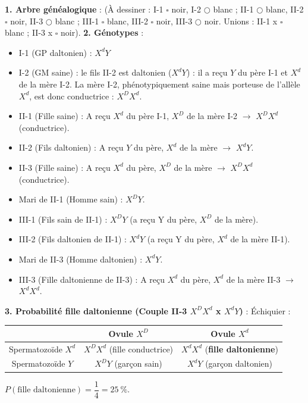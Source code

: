 \documentclass[11pt]{article}
\begin{document}
\begin{corrige}[Exercice n°1]
\textbf{1. Arbre généalogique} : (À dessiner : I-1 $\square$ noir, I-2 $\bigcirc$ blanc ; II-1 $\bigcirc$ blanc, II-2 $\square$ noir, II-3 $\bigcirc$ blanc ; III-1 $\square$ blanc, III-2 $\square$ noir, III-3 $\bigcirc$ noir. Unions : II-1 x $\square$ blanc ; II-3 x $\square$ noir).
\textbf{2. Génotypes} :
\begin{itemize}
\item I-1 (GP daltonien) : $X^d Y$
\item I-2 (GM saine) : le fils II-2 est daltonien ($X^d Y$) : il a reçu $Y$ du père I-1 et $X^d$ de la mère I-2. La mère I-2, phénotypiquement saine mais porteuse de l'allèle $X^d$, est donc conductrice : $X^D X^d$.
\item II-1 (Fille saine) : A reçu $X^d$ du père I-1, $X^D$ de la mère I-2 $\rightarrow$ $X^D X^d$ (conductrice).
\item II-2 (Fils daltonien) : A reçu $Y$ du père, $X^d$ de la mère $\rightarrow$ $X^d Y$.
\item II-3 (Fille saine) : A reçu $X^d$ du père, $X^D$ de la mère $\rightarrow$ $X^D X^d$ (conductrice).
\item Mari de II-1 (Homme sain) : $X^D Y$.
\item III-1 (Fils sain de II-1) : $X^D Y$ (a reçu Y du père, $X^D$ de la mère).
\item III-2 (Fils daltonien de II-1) : $X^d Y$ (a reçu Y du père, $X^d$ de la mère II-1).
\item Mari de II-3 (Homme daltonien) : $X^d Y$.
\item III-3 (Fille daltonienne de II-3) : A reçu $X^d$ du père, $X^d$ de la mère II-3 $\rightarrow$ $X^d X^d$.
\end{itemize}
\textbf{3. Probabilité fille daltonienne (Couple II-3 $X^D X^d$ x $X^d Y$)} :
Échiquier :
\begin{center}
\begin{tabular}{|c|c|c|}
\hline
\rowcolor{popblueL} & Ovule $X^D$ & Ovule $X^d$ \\
\hline
Spermatozoïde $X^d$ & $X^D X^d$ (fille conductrice) & $X^d X^d$ (\textbf{fille daltonienne}) \\
\hline
Spermatozoïde $Y$ & $X^D Y$ (garçon sain) & $X^d Y$ (garçon daltonien) \\
\hline
\end{tabular}
\end{center}
$P(\text{fille daltonienne}) = \dfrac{1}{4} = 25\ \%$.
\end{corrige}
\end{document}
